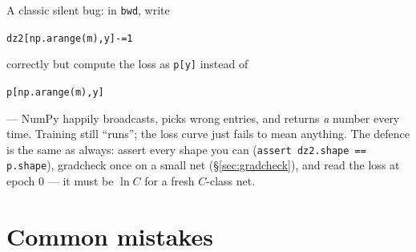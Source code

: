 \begin{example}
\label{ex:broadcast}
A classic silent bug: in \texttt{bwd}, write
\par\texttt{dz2[np.arange(m),y]-=1}\par
correctly but compute the loss as \texttt{p[y]} instead of
\par\texttt{p[np.arange(m),y]}\par
--- NumPy happily broadcasts, picks wrong entries, and returns \emph{a}
number every time. Training still ``runs''; the loss curve just fails to
mean anything. The defence is the same as always: assert every shape you
can (\texttt{assert dz2.shape == p.shape}), gradcheck once on a small net
(\S\ref{sec:gradcheck}), and read the loss at epoch 0 --- it must be
$\ln C$ for a fresh $C$-class net.
\end{example}

\section{Common mistakes}
\label{sec:nnmistakes}

